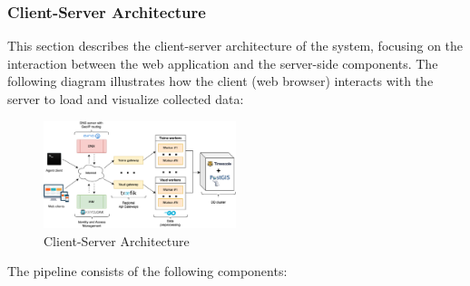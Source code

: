 \documentclass[12pt,a4paper]{article}
\begin{document}
\subsubsection*{Client-Server Architecture}

This section describes the client-server architecture of the system, focusing on the interaction between the web application and the server-side components. The following diagram illustrates how the client (web browser) interacts with the server to load and visualize collected data:

\begin{figure}[h!]
\centering
\includegraphics[width=0.5\textwidth]{../assets/diagrams/web_app_architecture/web_app_architecture.svg}
\caption{Client-Server Architecture}
\end{figure}

The pipeline consists of the following components:
\end{document}
